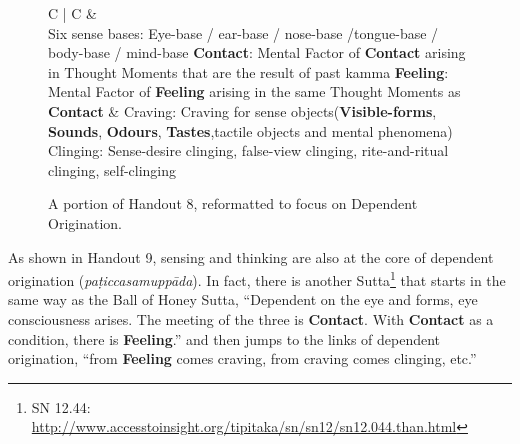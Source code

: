 \begin{figure}[H]
\begin{tabular*}{\textwidth}{C{\tabcolsep} | C{\tabcolsep}}
\toprule
{} &  \\
\midrule
Six sense bases:\newline
  Eye-base / ear-base / nose-base /\newline tongue-base / body-base / mind-base\newline\vspace{5mm}
  \textbf{Contact}:\newline
  Mental Factor of \textbf{Contact} arising in Thought Moments that are the result of past kamma\newline\vspace{5mm}
  \textbf{Feeling}:\newline
  Mental Factor of \textbf{Feeling} arising in the same Thought Moments as \textbf{Contact}
  &
  Craving:\newline
    Craving for sense objects\newline (\textbf{Visible-forms}, \textbf{Sounds}, \textbf{Odours}, \textbf{Tastes},\newline tactile objects and mental phenomena)
    \newline\vspace{5mm}
    Clinging:\newline
    Sense-desire clinging, false-view clinging, rite-and-ritual clinging, self-clinging
  \\
  
\bottomrule
\end{tabular*}
\caption{A portion of Handout 8, reformatted to focus on Dependent Origination.}
\end{figure}

As shown in Handout 9, sensing and thinking are also at the core of dependent origination (\textit{paṭiccasamuppāda}). In fact, there is another Sutta\footnote{SN 12.44: \url{http://www.accesstoinsight.org/tipitaka/sn/sn12/sn12.044.than.html}} that starts in the same way as the Ball of Honey Sutta, “Dependent on the eye and forms, eye consciousness arises. The meeting of the three is \textbf{Contact}. With \textbf{Contact} as a condition, there is \textbf{Feeling}.” and then jumps to the links of dependent origination, “from \textbf{Feeling} comes craving, from craving comes clinging, etc.”

